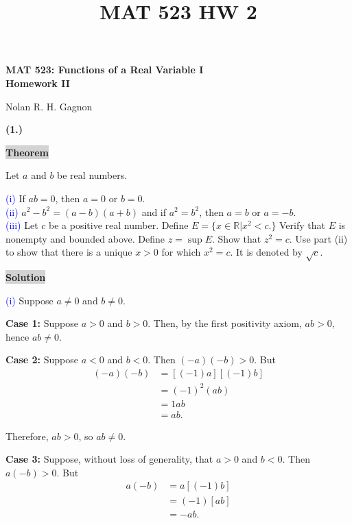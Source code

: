 \documentclass[12pt]{article}
\title{MAT 523 HW 2}
\newcommand{\mybox}{%
    \collectbox{%
        \setlength{\fboxsep}{2pt}%
        \fbox{\BOXCONTENT}%
    }%
}
\begin{document}
\begin{center}
\begin{large}
\textbf{MAT 523: Functions of a Real Variable I \\
Homework II \\}
\end{large}
Nolan R. H. Gagnon \\
\end{center}

\noindent \textbf{(1.)}

\vspace{3mm}

\noindent\mybox{\colorbox{lightgray}{\textbf{Theorem}}}\hspace{3mm}\hrulefill

\noindent Let $a$ and $b$ be real numbers. 

\begin{flushleft}
\textcolor{blue}{(i)} If $ab=0$, then $a=0$ or $b=0$. \\
\textcolor{blue}{(ii)} $a^2 - b^2 = (a-b)(a+b)$ and if $a^2=b^2$, then $a=b$ or $a=-b$. \\
\textcolor{blue}{(iii)} Let $c$ be a positive real number. Define $E=\lbrace x \in \mathbb{R} | x^2 < c.\rbrace$ Verify that $E$ is nonempty and bounded above. Define $z = \sup E$. Show that $z^2=c.$ Use part (ii) to show that there is a unique $x>0$ for which $x^2=c$. It is denoted by $\sqrt{c}$. 
\end{flushleft}

\vspace{5mm}

\noindent\mybox{\colorbox{lightgray}{\textbf{Solution}}}\hspace{3mm}\hrulefill

\noindent\textcolor{blue}{(i)} Suppose $a\neq 0$ and $b\neq 0$. 

\noindent \textbf{Case 1:} Suppose $a>0$ and $b>0$. Then, by the first positivity axiom, $ab>0$, hence $ab\neq 0$.

\noindent \textbf{Case 2:} Suppose $a<0$ and $b<0$. Then $(-a)(-b) > 0$. But
\begin{align*}
(-a)(-b) &= [(-1)a][(-1)b] \\
&= (-1)^2(ab) \\
&= 1ab \\
&= ab.
\end{align*}

\noindent Therefore, $ab>0$, so $ab\neq 0$.

\noindent\textbf{Case 3:} Suppose, without loss of generality, that $a>0$ and $b<0$. Then $a(-b) > 0$. But
\begin{align*}
a(-b) &= a[(-1)b] \\
&=(-1)[ab] \\
&= -ab.
\end{align*}
\end{document}
